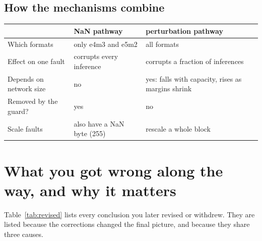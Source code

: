 \subsection{How the mechanisms combine}
\begin{center}
\small
\begin{tabular}{@{}lp{5.4cm}p{5.4cm}@{}}
\toprule
 & NaN pathway & perturbation pathway \\
\midrule
Which formats & only e4m3 and e5m2 & all formats \\
Effect on one fault & corrupts every inference & corrupts a fraction of inferences \\
Depends on network size & no & yes: falls with capacity, rises as margins shrink \\
Removed by the guard? & yes & no \\
Scale faults & also have a NaN byte (255) & rescale a whole block \\
\bottomrule
\end{tabular}
\end{center}

\section{What you got wrong along the way, and why it matters}
\label{sec:mistakes}
Table~\ref{tab:revised} lists every conclusion you later revised or withdrew. They are listed because the corrections changed the final picture, and because they share three causes.

